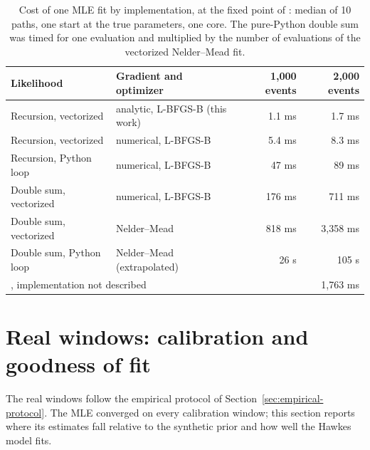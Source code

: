 \begin{table}[htbp]
\centering
\caption{Cost of one MLE fit by implementation, at the fixed point of \citet{lee2023}: median of
10 paths, one start at the true parameters, one core. The pure-Python double sum was timed for
one evaluation and multiplied by the number of evaluations of the vectorized Nelder--Mead fit.}
\label{tab:custo-variantes}
\small
\begin{tabular}{llrr}
\toprule
Likelihood & Gradient and optimizer & 1,000 events & 2,000 events\\
\midrule
Recursion, vectorized & analytic, L-BFGS-B (this work) & 1.1 ms & 1.7 ms\\
Recursion, vectorized & numerical, L-BFGS-B & 5.4 ms & 8.3 ms\\
Recursion, Python loop & numerical, L-BFGS-B & 47 ms & 89 ms\\
Double sum, vectorized & numerical, L-BFGS-B & 176 ms & 711 ms\\
Double sum, vectorized & Nelder--Mead & 818 ms & 3,358 ms\\
Double sum, Python loop & Nelder--Mead (extrapolated) & 26 s & 105 s\\
\midrule
\multicolumn{3}{l}{\citet{lee2023}, implementation not described} & 1,763 ms\\
\bottomrule
\end{tabular}
\end{table}

\section{Real windows: calibration and goodness of fit}

The real windows follow the empirical protocol of Section~\ref{sec:empirical-protocol}. The
MLE converged on every calibration window; this section reports where its estimates fall
relative to the synthetic prior and how well the Hawkes model fits.






